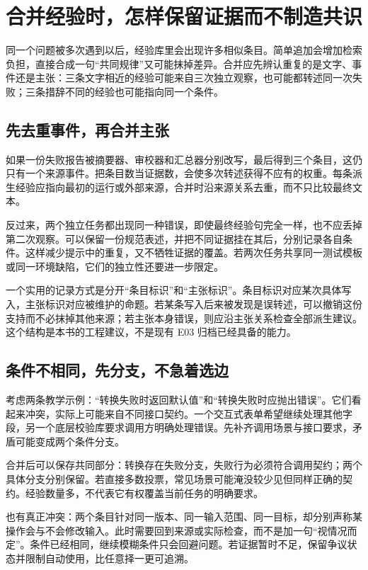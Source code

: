 \section{合并经验时，怎样保留证据而不制造共识}
\label{sec:ch05-merge}

同一个问题被多次遇到以后，经验库里会出现许多相似条目。简单追加会增加检索负担，直接合成一句“共同规律”又可能抹掉差异。合并应先辨认重复的是文字、事件还是主张：三条文字相近的经验可能来自三次独立观察，也可能都转述同一次失败；三条措辞不同的经验也可能指向同一个条件。

\subsection{先去重事件，再合并主张}

如果一份失败报告被摘要器、审校器和汇总器分别改写，最后得到三个条目，这仍只有一个来源事件。把条目数当证据数，会使多次转述获得不应有的权重。每条派生经验应指向最初的运行或外部来源，合并时沿来源关系去重，而不只比较最终文本。

反过来，两个独立任务都出现同一种错误，即使最终经验句完全一样，也不应丢掉第二次观察。可以保留一份规范表述，并把不同证据挂在其后，分别记录各自条件。这样减少提示中的重复，又不牺牲证据的覆盖。若两次任务共享同一测试模板或同一环境缺陷，它们的独立性还要进一步限定。

一个实用的记录方式是分开“条目标识”和“主张标识”。条目标识对应某次具体写入，主张标识对应被维护的命题。若某条写入后来被发现是误转述，可以撤销这份支持而不必抹掉其他来源；若主张本身错误，则应沿主张关系检查全部派生建议。这个结构是本书的工程建议，不是现有 E03 归档已经具备的能力。

\subsection{条件不相同，先分支，不急着选边}

考虑两条教学示例：“转换失败时返回默认值”和“转换失败时应抛出错误”。它们看起来冲突，实际上可能来自不同接口契约。一个交互式表单希望继续处理其他字段，另一个底层校验库要求调用方明确处理错误。先补齐调用场景与接口要求，矛盾可能变成两个条件分支。

合并后可以保存共同部分：转换存在失败分支，失败行为必须符合调用契约；两个具体分支分别保留。若直接多数投票，常见场景可能淹没较少见但同样正确的契约。经验数量多，不代表它有权覆盖当前任务的明确要求。

也有真正冲突：两个条目针对同一版本、同一输入范围、同一目标，却分别声称某操作会与不会修改输入。此时需要回到来源或实际检查，而不是加一句“视情况而定”。条件已经相同，继续模糊条件只会回避问题。若证据暂时不足，保留争议状态并限制自动使用，比任意择一更可追溯。

